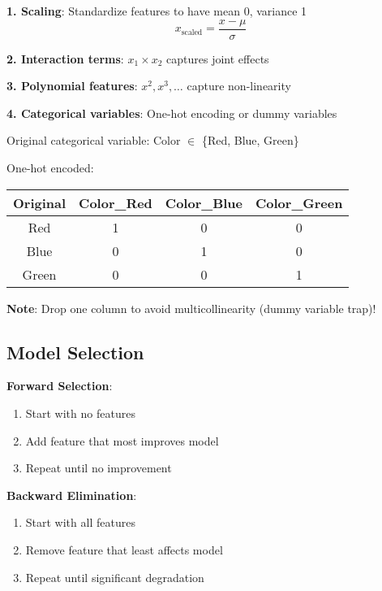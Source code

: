 \documentclass{article}
\newcounter{example}
\begin{document}
\textbf{1. Scaling}: Standardize features to have mean 0, variance 1
$$x_{\text{scaled}} = \frac{x - \mu}{\sigma}$$

\textbf{2. Interaction terms}: $x_1 \times x_2$ captures joint effects

\textbf{3. Polynomial features}: $x^2, x^3, \ldots$ capture non-linearity

\textbf{4. Categorical variables}: One-hot encoding or dummy variables

\begin{tcolorbox}[colback=purple!5!white,colframe=purple!75!black,title=Example \stepcounter{example}\#\theexample: One-Hot Encoding]

Original categorical variable: Color $\in$ \{Red, Blue, Green\}

One-hot encoded:
\begin{center}
\begin{tabular}{|c|c|c|c|}
\hline
\textbf{Original} & \textbf{Color\_Red} & \textbf{Color\_Blue} & \textbf{Color\_Green} \\
\hline
Red & 1 & 0 & 0 \\
Blue & 0 & 1 & 0 \\
Green & 0 & 0 & 1 \\
\hline
\end{tabular}
\end{center}

\textbf{Note}: Drop one column to avoid multicollinearity (dummy variable trap)!
\end{tcolorbox}

\subsection{Model Selection}

\textbf{Forward Selection}:
\begin{enumerate}
    \item Start with no features
    \item Add feature that most improves model
    \item Repeat until no improvement
\end{enumerate}

\textbf{Backward Elimination}:
\begin{enumerate}
    \item Start with all features
    \item Remove feature that least affects model
    \item Repeat until significant degradation
\end{enumerate}
\end{document}
